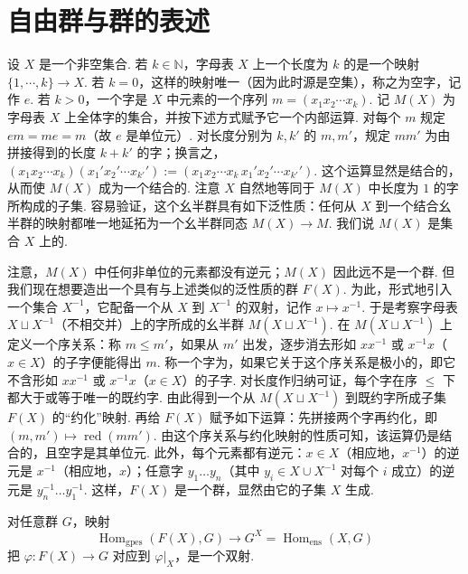 \section{自由群与群的表述}\label{sec:fg-2-3}
\begin{numpara}[自由群]\label{np:fg-2-3-1}
设 $X$ 是一个非空集合. 若 $k\in\mathbb{N}$，字母表 $X$ 上一个长度为 $k$ 的是一个映射 $\{1,\cdots,k\}\longrightarrow X$. 若 $k=0$，这样的映射唯一（因为此时源是空集），称之为空字，记作 $e$. 若 $k>0$，一个字是 $X$ 中元素的一个序列 $m=(x_1x_2\cdots x_k)$. 记 $M(X)$ 为字母表 $X$ 上全体字的集合，并按下述方式赋予它一个内部运算. 对每个 $m$ 规定 $em=me=m$（故 $e$ 是单位元）. 对长度分别为 $k,k'$ 的 $m,m'$，规定 $mm'$ 为由拼接得到的长度 $k+k'$ 的字；换言之，$(x_1x_2\cdots x_k)(x_1'x_2'\cdots x_{k'}'):=(x_1x_2\cdots x_k\,x_1'x_2'\cdots x_{k'}')$. 这个运算显然是结合的，从而使 $M(X)$ 成为一个结合的. 注意 $X$ 自然地等同于 $M(X)$ 中长度为 $1$ 的字所构成的子集. 容易验证，这个幺半群具有如下泛性质：任何从 $X$ 到一个结合幺半群的映射都唯一地延拓为一个幺半群同态 $M(X)\longrightarrow M$. 我们说 $M(X)$ 是集合 $X$ 上的.
\end{numpara}
注意，$M(X)$ 中任何非单位的元素都没有逆元；$M(X)$ 因此远不是一个群. 但我们现在想要造出一个具有与上述类似的泛性质的群 $F(X)$. 为此，形式地引入一个集合 $X^{-1}$，它配备一个从 $X$ 到 $X^{-1}$ 的双射，记作 $x\mapsto x^{-1}$. 于是考察字母表 $X\sqcup X^{-1}$（不相交并）上的字所成的幺半群 $M(X\sqcup X^{-1})$. 在 $M(X\sqcup X^{-1})$ 上定义一个序关系：称 $m\le m'$，如果从 $m'$ 出发，逐步消去形如 $xx^{-1}$ 或 $x^{-1}x$（$x\in X$）的子字便能得出 $m$. 称一个字为，如果它关于这个序关系是极小的，即它不含形如 $xx^{-1}$ 或 $x^{-1}x$（$x\in X$）的子字. 对长度作归纳可证，每个字在序 $\le$ 下都大于或等于唯一的既约字. 由此得到一个从 $M(X\sqcup X^{-1})$ 到既约字所成子集 $F(X)$ 的``约化''映射. 再给 $F(X)$ 赋予如下运算：先拼接两个字再约化，即 $(m,m')\mapsto\operatorname{red}(mm')$. 由这个序关系与约化映射的性质可知，该运算仍是结合的，且空字是其单位元. 此外，每个元素都有逆元：$x\in X$（相应地，$x^{-1}$）的逆元是 $x^{-1}$（相应地，$x$）；任意字 $y_1\ldots y_n$（其中 $y_i\in X\cup X^{-1}$ 对每个 $i$ 成立）的逆元是 $y_n^{-1}\ldots y_1^{-1}$. 这样，$F(X)$ 是一个群，显然由它的子集 $X$ 生成.
\begin{proposition*}
对任意群 $G$，映射
\[
\operatorname{Hom}_{\mathrm{gpes}}(F(X),G)\longrightarrow G^X=\operatorname{Hom}_{\mathrm{ens}}(X,G)
\]
把 $\varphi:F(X)\longrightarrow G$ 对应到 $\varphi|_X$，是一个双射.
\end{proposition*}
